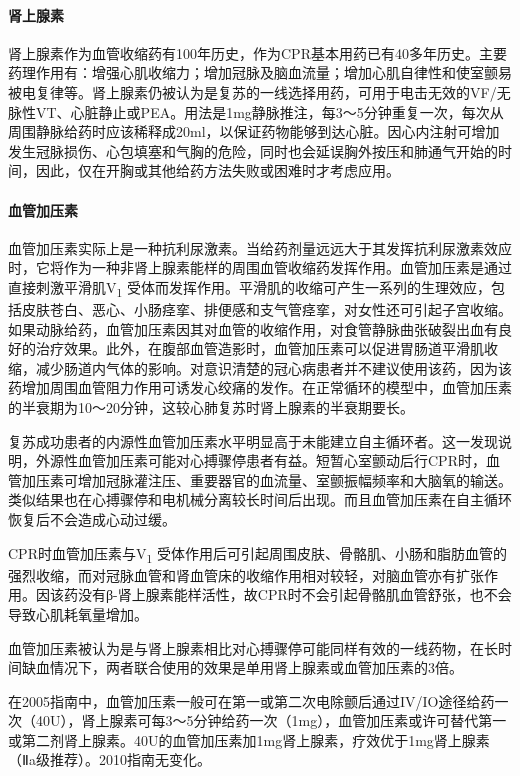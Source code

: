 \paragraph{肾上腺素}

肾上腺素作为血管收缩药有100年历史，作为CPR基本用药已有40多年历史。主要药理作用有：增强心肌收缩力；增加冠脉及脑血流量；增加心肌自律性和使室颤易被电复律等。肾上腺素仍被认为是复苏的一线选择用药，可用于电击无效的VF/无脉性VT、心脏静止或PEA。用法是1mg静脉推注，每3～5分钟重复一次，每次从周围静脉给药时应该稀释成20ml，以保证药物能够到达心脏。因心内注射可增加发生冠脉损伤、心包填塞和气胸的危险，同时也会延误胸外按压和肺通气开始的时间，因此，仅在开胸或其他给药方法失败或困难时才考虑应用。

\paragraph{血管加压素}

血管加压素实际上是一种抗利尿激素。当给药剂量远远大于其发挥抗利尿激素效应时，它将作为一种非肾上腺素能样的周围血管收缩药发挥作用。血管加压素是通过直接刺激平滑肌V\textsubscript{1}
受体而发挥作用。平滑肌的收缩可产生一系列的生理效应，包括皮肤苍白、恶心、小肠痉挛、排便感和支气管痉挛，对女性还可引起子宫收缩。如果动脉给药，血管加压素因其对血管的收缩作用，对食管静脉曲张破裂出血有良好的治疗效果。此外，在腹部血管造影时，血管加压素可以促进胃肠道平滑肌收缩，减少肠道内气体的影响。对意识清楚的冠心病患者并不建议使用该药，因为该药增加周围血管阻力作用可诱发心绞痛的发作。在正常循环的模型中，血管加压素的半衰期为10～20分钟，这较心肺复苏时肾上腺素的半衰期要长。

复苏成功患者的内源性血管加压素水平明显高于未能建立自主循环者。这一发现说明，外源性血管加压素可能对心搏骤停患者有益。短暂心室颤动后行CPR时，血管加压素可增加冠脉灌注压、重要器官的血流量、室颤振幅频率和大脑氧的输送。类似结果也在心搏骤停和电机械分离较长时间后出现。而且血管加压素在自主循环恢复后不会造成心动过缓。

CPR时血管加压素与V\textsubscript{1}
受体作用后可引起周围皮肤、骨骼肌、小肠和脂肪血管的强烈收缩，而对冠脉血管和肾血管床的收缩作用相对较轻，对脑血管亦有扩张作用。因该药没有β-肾上腺素能样活性，故CPR时不会引起骨骼肌血管舒张，也不会导致心肌耗氧量增加。

血管加压素被认为是与肾上腺素相比对心搏骤停可能同样有效的一线药物，在长时间缺血情况下，两者联合使用的效果是单用肾上腺素或血管加压素的3倍。

在2005指南中，血管加压素一般可在第一或第二次电除颤后通过IV/IO途径给药一次（40U），肾上腺素可每3～5分钟给药一次（1mg），血管加压素或许可替代第一或第二剂肾上腺素。40U的血管加压素加1mg肾上腺素，疗效优于1mg肾上腺素（Ⅱa级推荐）。2010指南无变化。

